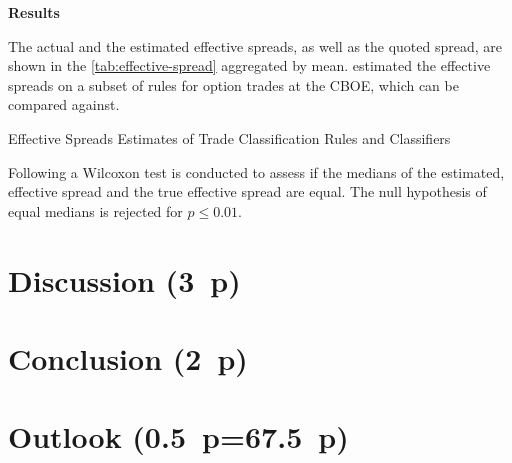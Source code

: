 \textbf{Results}

The actual and the estimated effective spreads, as well as the quoted spread, are shown in the \cref{tab:effective-spread} aggregated by mean. \textcite[][896--897]{savickasInferringDirectionOption2003} estimated the effective spreads on a subset of rules for option trades at the \gls{CBOE}, which can be compared against.

\begin{table}[H]
    \centering
    
    \caption{Effective Spreads Estimates of Trade Classification Rules and Classifiers}
    \label{tab:effective-spread}
\end{table}

Following \textcite[][12]{theissenTestAccuracyLee2000} a Wilcoxon test is conducted to assess if the medians of the estimated, effective spread and the true effective spread are equal. The null hypothesis of equal medians is rejected for $p \leq 0.01$.



\newpage
\section{Discussion (3~p)}\label{sec:discussion}

\newpage
\section{Conclusion (2~p)}\label{sec:conclusion}

\newpage
\section{Outlook (0.5~p=67.5~p)}\label{sec:outlook}

